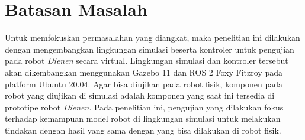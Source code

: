 \section{Batasan Masalah}
\label{sec:batasanmasalah}

Untuk memfokuskan permasalahan yang diangkat,
  maka penelitian ini dilakukan dengan mengembangkan lingkungan simulasi beserta kontroler untuk pengujian pada robot \emph{Dienen} secara virtual.
Lingkungan simulasi dan kontroler tersebut akan dikembangkan menggunakan Gazebo 11 dan ROS 2 Foxy Fitzroy pada platform Ubuntu 20.04.
Agar bisa diujikan pada robot fisik,
  komponen pada robot yang diujikan di simulasi adalah komponen yang saat ini tersedia di prototipe robot \emph{Dienen}.
Pada penelitian ini, pengujian yang dilakukan fokus terhadap kemampuan model robot di lingkungan simulasi untuk melakukan tindakan dengan hasil yang sama dengan yang bisa dilakukan di robot fisik.
